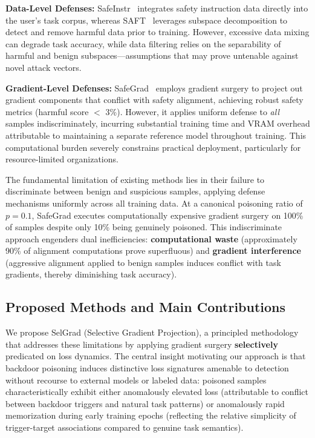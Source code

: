 \textbf{Data-Level Defenses:} SafeInstr~\cite{bianchi2024safetytuned} integrates safety instruction data directly into the user's task corpus, whereas SAFT~\cite{chen2024saft} leverages subspace decomposition to detect and remove harmful data prior to training. However, excessive data mixing can degrade task accuracy, while data filtering relies on the separability of harmful and benign subspaces---assumptions that may prove untenable against novel attack vectors.

\textbf{Gradient-Level Defenses:} SafeGrad~\cite{yi2025safegrad} employs gradient surgery to project out gradient components that conflict with safety alignment, achieving robust safety metrics (harmful score $<$ 3\%). However, it applies uniform defense to \textit{all} samples indiscriminately, incurring substantial training time and VRAM overhead attributable to maintaining a separate reference model throughout training. This computational burden severely constrains practical deployment, particularly for resource-limited organizations.

The fundamental limitation of existing methods lies in their failure to discriminate between benign and suspicious samples, applying defense mechanisms uniformly across all training data. At a canonical poisoning ratio of $p=0.1$, SafeGrad executes computationally expensive gradient surgery on 100\% of samples despite only 10\% being genuinely poisoned. This indiscriminate approach engenders dual inefficiencies: \textbf{computational waste} (approximately 90\% of alignment computations prove superfluous) and \textbf{gradient interference} (aggressive alignment applied to benign samples induces conflict with task gradients, thereby diminishing task accuracy).

\subsection*{Proposed Methods and Main Contributions}
We propose SelGrad (Selective Gradient Projection), a principled methodology that addresses these limitations by applying gradient surgery \textbf{selectively} predicated on loss dynamics. The central insight motivating our approach is that backdoor poisoning induces distinctive loss signatures amenable to detection without recourse to external models or labeled data: poisoned samples characteristically exhibit either anomalously elevated loss (attributable to conflict between backdoor triggers and natural task patterns) or anomalously rapid memorization during early training epochs (reflecting the relative simplicity of trigger-target associations compared to genuine task semantics).

